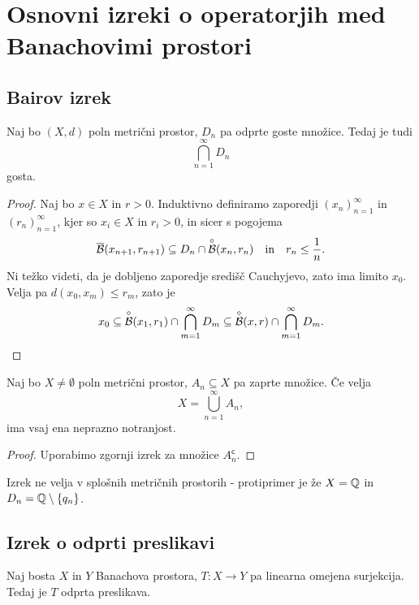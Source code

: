 \section{Osnovni izreki o operatorjih med Banachovimi prostori}

\subsection{Bairov izrek}

\begin{izrek}[Baire]
Naj bo $(X,d)$ poln metrični prostor, $D_n$ pa odprte goste
množice. Tedaj je tudi
\[
\bigcap_{n=1}^\infty D_n
\]
gosta.
\end{izrek}

\begin{proof}
Naj bo $x \in X$ in $r > 0$. Induktivno definiramo zaporedji
$(x_n)_{n=1}^\infty$ in $(r_n)_{n=1}^\infty$, kjer so $x_i \in X$
in $r_i > 0$, in sicer s pogojema
\[
\overline{\mathcal{B}}(x_{n+1}, r_{n+1}) \subseteq D_n \cap
\overset{\circ}{\mathcal{B}}(x_n, r_n)
\quad \text{in} \quad
r_n \leq \frac{1}{n}.
\]
Ni težko videti, da je dobljeno zaporedje središč Cauchyjevo, zato
ima limito $x_0$. Velja pa $d(x_0, x_m) \leq r_m$, zato je
\[
x_0 \subseteq
\overset{\circ}{\mathcal{B}}(x_1, r_1) \cap \bigcap_{m=1}^\infty D_m \subseteq
\overset{\circ}{\mathcal{B}}(x, r) \cap \bigcap_{m=1}^\infty D_m. \qedhere
\]
\end{proof}

\begin{posledica}
Naj bo $X \ne \emptyset$ poln metrični prostor, $A_n \subseteq X$
pa zaprte množice. Če velja
\[
X = \bigcup_{n=1}^\infty A_n,
\]
ima vsaj ena neprazno notranjost.
\end{posledica}

\begin{proof}
Uporabimo zgornji izrek za množice $A_n^{\mathsf{c}}$.
\end{proof}

\begin{opomba}
Izrek ne velja v splošnih metričnih prostorih - protiprimer je že
$X = \mathbb{Q}$ in $D_n = \mathbb{Q} \setminus \left\{q_n\right\}$.
\end{opomba}

\newpage

\subsection{Izrek o odprti preslikavi}


\begin{izrek}
Naj bosta $X$ in $Y$ Banachova prostora, $T \colon X \to Y$ pa
linearna omejena surjekcija. Tedaj je $T$ odprta preslikava.
\end{izrek}

